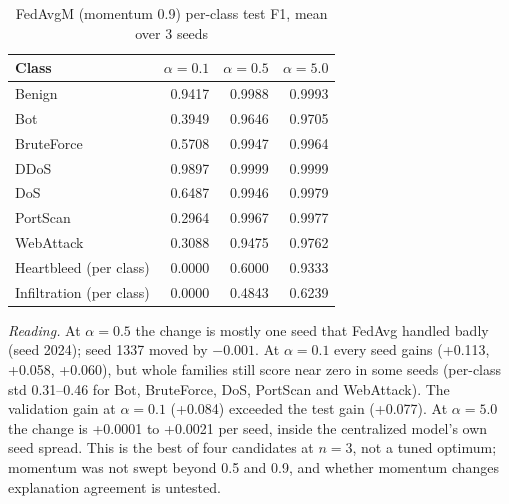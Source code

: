 \begin{table}[h]
\centering
\caption{FedAvgM (momentum 0.9) per-class test F1, mean over 3 seeds} %
\label{tab:prereg_class}
\footnotesize
\begin{tabular}{@{}lrrr@{}}
\toprule
Class & $\alpha=0.1$ & $\alpha=0.5$ & $\alpha=5.0$\\ %
\midrule
Benign & 0.9417 & 0.9988 & 0.9993\\ %
Bot & 0.3949 & 0.9646 & 0.9705\\ %
BruteForce & 0.5708 & 0.9947 & 0.9964\\ %
DDoS & 0.9897 & 0.9999 & 0.9999\\ %
DoS & 0.6487 & 0.9946 & 0.9979\\ %
PortScan & 0.2964 & 0.9967 & 0.9977\\ %
WebAttack & 0.3088 & 0.9475 & 0.9762\\ %
Heartbleed (per class) & 0.0000 & 0.6000 & 0.9333\\ %
Infiltration (per class) & 0.0000 & 0.4843 & 0.6239\\ %
\bottomrule
\end{tabular}
\end{table}

\emph{Reading.} At $\alpha=0.5$ the change is mostly one seed that FedAvg handled badly %
(seed 2024); seed 1337 moved by $-0.001$. At $\alpha=0.1$ every seed gains (+0.113, %
+0.058, +0.060), but whole families still score near zero in some seeds (per-class std %
0.31--0.46 for Bot, BruteForce, DoS, PortScan and WebAttack). The validation gain at %
$\alpha=0.1$ (+0.084) exceeded the test gain (+0.077). At $\alpha=5.0$ the change is %
+0.0001 to +0.0021 per seed, inside the centralized model's own seed spread. This is the %
best of four candidates at $n=3$, not a tuned optimum; momentum was not swept beyond 0.5 %
and 0.9, and whether momentum changes explanation agreement is untested. %

